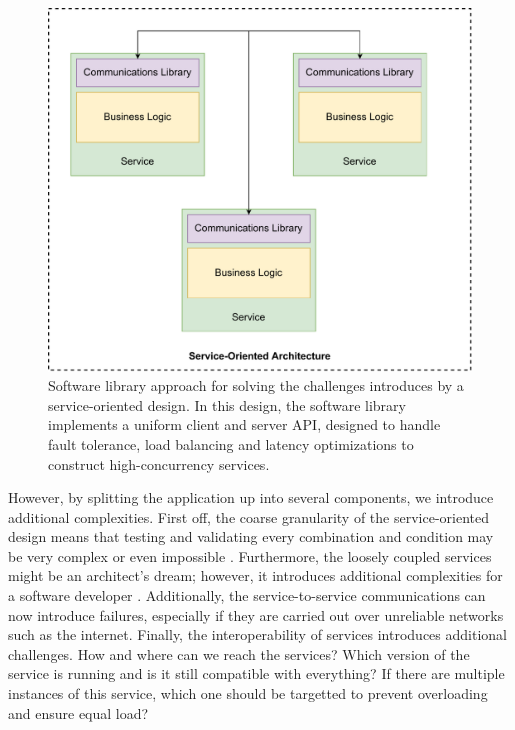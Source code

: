 \begin{figure}[!t]
    \centering
    
    \includegraphics[width=.7\linewidth]{2_background/figures/software-lib-approach.pdf}

    \caption[Software library approach for solving networking challenges.]{Software library approach for solving the challenges introduces by a service-oriented design. In this design, the software library implements a uniform client and server API, designed to  handle fault tolerance, load balancing and latency optimizations to construct high-concurrency services.}
    \label{fig:software-lib-approach}
\end{figure}

However, by splitting the application up into several components, we introduce additional complexities. First off, the coarse granularity of the service-oriented design means that testing and validating every combination and condition may be very complex or even impossible \cite{mahmood2007service}. Furthermore, the loosely coupled services might be an architect's dream; however, it introduces additional complexities for a software developer \cite{fowler2012patterns}. Additionally, the service-to-service communications can now introduce failures, especially if they are carried out over unreliable networks such as the internet. Finally, the interoperability of services introduces additional challenges. How and where can we reach the services? Which version of the service is running and is it still compatible with everything? If there are multiple instances of this service, which one should be targetted to prevent overloading and ensure equal load? 



